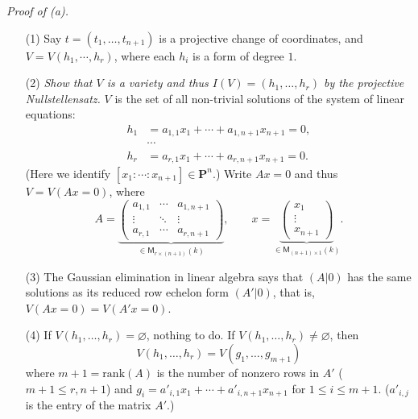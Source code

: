\documentclass{article}
\begin{document}
\emph{Proof of (a).}
\begin{enumerate}
\item[(1)]
  Say $t = (t_1,\ldots,t_{n+1})$ is a projective change of coordinates,
  and $V = V(h_1, \cdots, h_r)$, where each $h_i$ is a form of degree $1$.

\item[(2)]
  \emph{Show that $V$ is a variety and thus $I(V) = (h_1, \ldots, h_r)$
  by the projective Nullstellensatz.}
  $V$ is the set of all non-trivial solutions of the system of linear equations:
  \begin{align*}
    h_1 &= a_{1,1} x_1 + \cdots + a_{1,n+1} x_{n+1} = 0, \\
    &\cdots \\
    h_r &= a_{r,1} x_1 + \cdots + a_{r,n+1} x_{n+1} = 0.
  \end{align*}
  (Here we identify $[x_1 : \cdots : x_{n+1}] \in \mathbf{P}^{n}$.)
  Write $Ax = 0$ and thus $V = V(Ax = 0)$, where
  \[
    A =
    \underbrace{\begin{pmatrix}
    a_{1,1} & \cdots & a_{1,n+1} \\
    \vdots & \ddots & \vdots \\
    a_{r,1} & \cdots & a_{r,n+1}
    \end{pmatrix}}_{\in \mathsf{M}_{r \times (n+1)}(k)},
    \qquad
    x =
    \underbrace{\begin{pmatrix}
    x_1 \\
    \vdots \\
    x_{n+1}
    \end{pmatrix}}_{\in \mathsf{M}_{(n+1) \times 1}(k)}.
  \]

\item[(3)]
  The Gaussian elimination in linear algebra says that
  $(A|0)$ has the same solutions as its reduced row echelon form $(A'|0)$,
  that is, $V(Ax = 0) = V(A'x = 0)$.

\item[(4)]
  If $V(h_1, \ldots, h_r) = \varnothing$, nothing to do.
  If $V(h_1, \ldots, h_r) \neq \varnothing$, then
  \[
    V(h_1, \ldots, h_r) = V(g_1, \ldots, g_{m+1})
  \]
  where $m+1 = \mathrm{rank}(A)$ is the number of nonzero rows in $A'$ ($m+1 \leq r, n+1$)
  and $g_i = a'_{i,1} x_1 + \cdots + a'_{i,n+1} x_{n+1}$ for $1 \leq i \leq m+1$.
  ($a'_{i,j}$ is the entry of the matrix $A'$.)


\end{enumerate}
\end{document}
